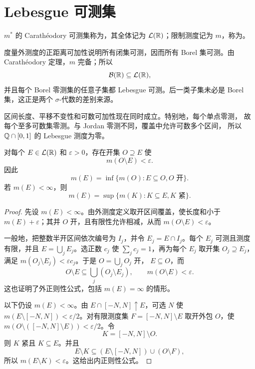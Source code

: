 \section{Lebesgue 可测集}

\begin{definition}
$m^*$ 的 Carathéodory 可测集称为，其全体记为
$\mathcal L(\mathbb{R})$；限制测度记为 $m$，称为。
\end{definition}

度量外测度的正距离可加性说明所有闭集可测，因而所有 Borel 集可测。由
Carathéodory 定理，$m$ 完备；所以
\[
 \mathcal B(\mathbb{R})\subseteq\mathcal L(\mathbb{R}),
\]
并且每个 Borel 零测集的任意子集都 Lebesgue 可测。后一类子集未必是
Borel 集，这正是两个 $\sigma$-代数的差别来源。

区间长度、平移不变性和可数可加性现在同时成立。特别地，每个单点零测，
故每个至多可数集零测。与 Jordan 零测不同，覆盖中允许可数多个区间，
所以 $\mathbb{Q}\cap[0,1]$ 的 Lebesgue 测度为零。

\begin{theorem}
\label{thm:lebesgue-regularity-line}
对每个 $E\in\mathcal L(\mathbb{R})$ 和 $\varepsilon>0$，存在开集 $O\supseteq E$
使
\[
 m(O\setminus E)<\varepsilon.
\]
因此
\[
 m(E)=\inf\{m(O):E\subseteq O, O\text{ 开}\}.
\]
若 $m(E)<\infty$，则
\[
 m(E)=\sup\{m(K):K\subseteq E, K\text{ 紧}\}.
\]
\end{theorem}

\begin{proof}
先设 $m(E)<\infty$。由外测度定义取开区间覆盖，使长度和小于
$m(E)+\varepsilon$；其并 $O$ 开，且有限性允许相减，从而
$m(O\setminus E)<\varepsilon$。

一般地，把整数半开区间依次编号为 $I_j$，并令 $E_j=E\cap I_j$。每个
$E_j$ 可测且测度有限，并且 $E=\bigcup_jE_j$。选正数 $c_j$ 使
$\sum_jc_j=1$，再为每个 $E_j$ 取开集 $O_j\supseteq E_j$，满足
$m(O_j\setminus E_j)<\varepsilon c_j$。于是 $O=\bigcup_jO_j$ 开，
$E\subseteq O$，而
\[
 O\setminus E\subseteq\bigcup_j(O_j\setminus E_j),
 \qquad m(O\setminus E)<\varepsilon.
\]
这也证明了外正则性公式，包括 $m(E)=\infty$ 的情形。

以下仍设 $m(E)<\infty$。由
$E\cap[-N,N]\uparrow E$，可选 $N$ 使
$m(E\setminus[-N,N])<\varepsilon/2$。对有限测度集
$F=[-N,N]\setminus E$ 取开外包 $O$，使
$m(O\setminus([-N,N]\setminus E))<\varepsilon/2$。令
\[
 K=[-N,N]\setminus O.
\]
则 $K$ 紧且 $K\subseteq E$。并且
\[
 E\setminus K
 \subseteq (E\setminus[-N,N])\cup(O\setminus F),
\]
所以 $m(E\setminus K)<\varepsilon$。这给出内正则性公式。
\end{proof}

